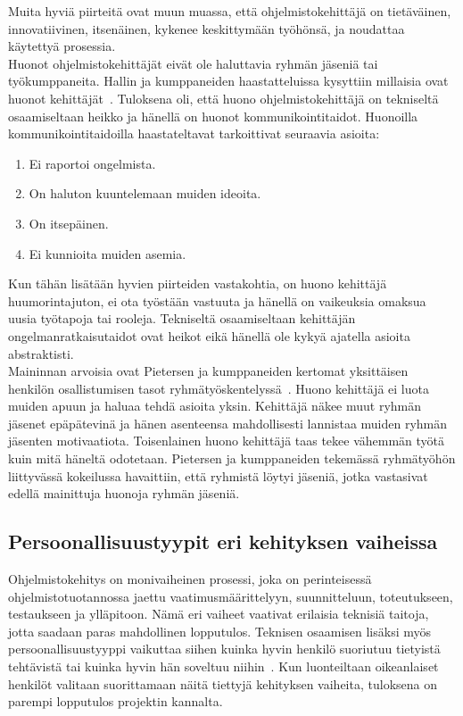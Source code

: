 \documentclass[finnish]{../tktltiki2}
\theoremstyle{definition}
\theoremstyle{remark}
\begin{document}
Muita hyviä piirteitä ovat muun muassa, että ohjelmistokehittäjä
on tietäväinen, innovatiivinen, itsenäinen, kykenee keskittymään työhönsä, ja noudattaa käytettyä prosessia.\\

Huonot ohjelmistokehittäjät eivät ole haluttavia ryhmän jäseniä tai
työkumppaneita. Hallin ja kumppaneiden haastatteluissa kysyttiin millaisia ovat huonot kehittäjät~\cite{Hall:2007:CNT:1235000.1235043}. Tuloksena oli, että huono ohjelmistokehittäjä on tekniseltä osaamiseltaan heikko ja hänellä on huonot kommunikointitaidot. Huonoilla kommunikointitaidoilla haastateltavat tarkoittivat seuraavia asioita:

\begin{enumerate}

\item Ei raportoi ongelmista.
\item On haluton kuuntelemaan muiden ideoita.
\item On itsepäinen.
\item Ei kunnioita muiden asemia.

\end{enumerate}

Kun tähän lisätään hyvien piirteiden vastakohtia, on huono kehittäjä huumorintajuton, ei ota työstään vastuuta ja hänellä on vaikeuksia omaksua uusia työtapoja tai rooleja. Tekniseltä osaamiseltaan kehittäjän ongelmanratkaisutaidot ovat heikot eikä hänellä ole kykyä ajatella asioita abstraktisti.\\

Maininnan arvoisia ovat Pietersen ja kumppaneiden kertomat yksittäisen henkilön osallistumisen tasot ryhmä\-työskentelyssä~\cite{Pieterse:2012:PPS:2157136.2157218}.
Huono kehittäjä ei luota muiden apuun ja haluaa tehdä asioita yksin. Kehittäjä näkee muut ryhmän jäsenet epäpätevinä ja hänen asenteensa mahdollisesti lannistaa muiden ryhmän jäsenten motivaatiota. Toisenlainen huono kehittäjä taas tekee vähemmän työtä kuin mitä häneltä odotetaan.
Pietersen ja kumppaneiden tekemässä ryhmätyöhön liittyvässä kokeilussa havaittiin, että ryhmistä löytyi jäseniä, jotka vastasivat edellä mainittuja huonoja ryhmän jäseniä.

\subsection{Persoonallisuustyypit eri kehityksen vaiheissa}

Ohjelmistokehitys on monivaiheinen prosessi, joka on perinteisessä ohjelmistotuotannossa
jaettu vaatimusmäärittelyyn, suunnitteluun, toteutukseen, testaukseen
ja ylläpitoon. Nämä eri vaiheet vaativat erilaisia teknisiä taitoja,
jotta saadaan paras mahdollinen lopputulos. Teknisen
osaamisen lisäksi myös persoonallisuustyyppi vaikuttaa siihen kuinka
hyvin henkilö suoriutuu tietyistä tehtävistä tai kuinka hyvin hän
soveltuu niihin~\cite{Capretz:2010:MSS:1726559.1726574}. Kun luonteiltaan oikeanlaiset henkilöt valitaan suorittamaan
näitä tiettyjä kehityksen vaiheita, tuloksena on parempi lopputulos
projektin kannalta.\\
\end{document}
